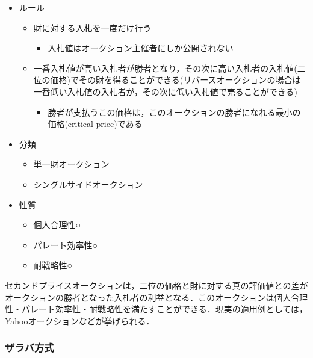 \begin{itemize}
\tightlist
\item
  ルール

  \begin{itemize}
  \tightlist
  \item
    財に対する入札を一度だけ行う

    \begin{itemize}
    \tightlist
    \item
      入札値はオークション主催者にしか公開されない
    \end{itemize}
  \item
    一番入札値が高い入札者が勝者となり，その次に高い入札者の入札値(二位の価格)でその財を得ることができる(リバースオークションの場合は一番低い入札値の入札者が，その次に低い入札値で売ることができる)

    \begin{itemize}
    \tightlist
    \item
      勝者が支払うこの価格は，このオークションの勝者になれる最小の価格(critical
      price)である
    \end{itemize}
  \end{itemize}
\item
  分類

  \begin{itemize}
  \tightlist
  \item
    単一財オークション
  \item
    シングルサイドオークション
  \end{itemize}
\item
  性質

  \begin{itemize}
  \tightlist
  \item
    個人合理性○
  \item
    パレート効率性○
  \item
    耐戦略性○
  \end{itemize}
\end{itemize}

セカンドプライスオークションは，二位の価格と財に対する真の評価値との差がオークションの勝者となった入札者の利益となる．このオークションは個人合理性・パレート効率性・耐戦略性を満たすことができる．現実の適用例としては，Yahooオークションなどが挙げられる．

\hypertarget{ux30b6ux30e9ux30d0ux65b9ux5f0f}{%
\subsubsection{ザラバ方式}\label{ux30b6ux30e9ux30d0ux65b9ux5f0f}}

